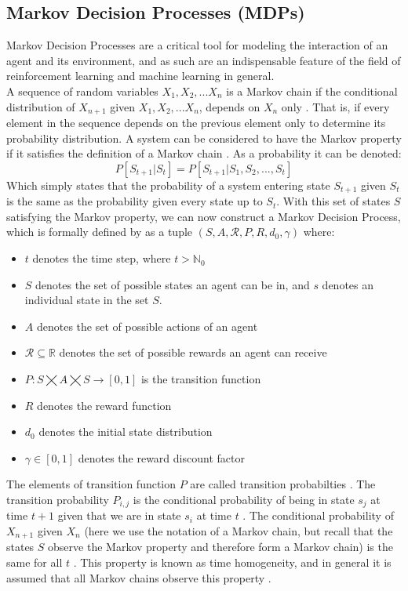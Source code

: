 \documentclass[12pt]{article}
\begin{document}
\subsection{Markov Decision Processes (MDPs)}\label{markov}
Markov Decision Processes are a critical tool for modeling the interaction of an agent and its environment, and as such are an indispensable feature of the field of reinforcement learning and machine learning in general.\\\newline
A sequence of random variables $X_1,X_2,...X_n$ is a Markov chain if the conditional distribution of $X_{n+1}$ given $X_1,X_2,...X_n$, depends on $X_n$ only \autocite{brooks2011handbook}. That is, if every element in the sequence depends on the previous element only to determine its probability distribution.
A system can be considered to have the Markov property if it satisfies the definition of a Markov chain \autocite{1976Ttos}. As a probability it can be denoted: 
\begin{equation}
    P[S_{t+1} | S_t] = P[S_{t+1} | S_1, S_2, ...,S_t]
\end{equation}
Which simply states that the probability of a system entering state $S_{t+1}$ given $S_t$ is the same as the probability given every state up to $S_t$.
With this set of states $S$ satisfying the Markov property, we can now construct a Markov Decision Process, which is formally defined by \textcite{thomas2015notation} as a tuple $(S,A,\mathcal{R},P,R,d_0,\gamma)$ where:
\begin{itemize}
 \item   $t$ denotes the time step, where $t>\mathbb{N}_0$
 \item$S$ denotes the set of possible states an agent can be in, and $s$ denotes an individual state in the set $S$.
 \item $A$ denotes the set of possible actions of an agent \autocite{haggstrom2002finite}
 \item$\mathcal{R}\subseteq\mathbb{R}$ denotes the set of possible rewards an agent can receive
 \item$P:S\bigtimes A \bigtimes S \rightarrow [0,1]$ is the transition function 
 \item$R$ denotes the reward function 
 \item$d_0$ denotes the initial state distribution 
 \item$\gamma\in [0,1]$ denotes the reward discount factor
\end{itemize}
The elements of transition function $P$ are called transition probabilties \autocite{haggstrom2002finite}. The transition probability $P_{i,j}$ is the conditional probability of being in state $s_j$ at time $t+1$ given that we are in state $s_i$ at time $t$ \autocite{haggstrom2002finite}. The conditional probability of $X_{n+1}$ given $X_n$ (here we use the notation of a Markov chain, but recall that the states $S$ observe the Markov property and therefore form a Markov chain) is the same for all $t$ \autocite{haggstrom2002finite}. This property is known as time homogeneity, and in general it is assumed that all Markov chains observe this property \autocite{haggstrom2002finite}.\\\newline
\end{document}
